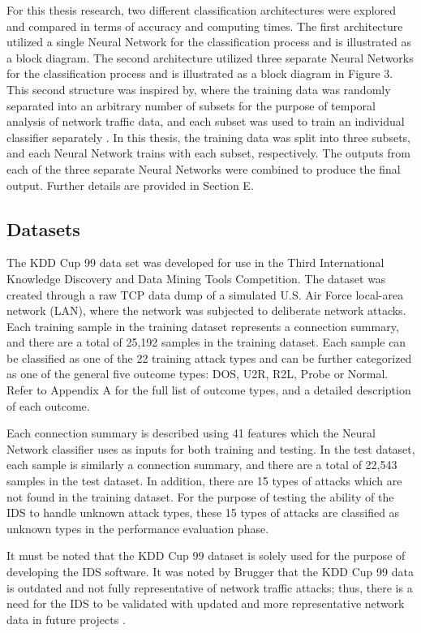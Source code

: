 \documentclass[12pt]{article}
\theoremstyle{definition}
\begin{document}
		For this thesis research, two different classification architectures were explored and compared in terms of accuracy and computing times. The first architecture utilized a single Neural Network for the classification process and is illustrated as a block diagram. The second architecture utilized three separate Neural Networks for the classification process and is illustrated as a block diagram in Figure 3. This second structure was inspired by, where the training data was randomly separated into an arbitrary number of subsets for the purpose of temporal analysis of network traffic data, and each subset was used to train an individual classifier separately \cite{Shamshirband2014}. In this thesis, the training data was split into three subsets, and each Neural Network trains with each subset, respectively. The outputs from each of the three separate Neural Networks were combined to produce the final output. Further details are provided in Section E.
		
		\subsection{Datasets}
		
		The KDD Cup 99 data set was developed for use in the Third International Knowledge Discovery and Data Mining Tools Competition. The dataset was created through a raw TCP data dump of a simulated U.S. Air Force local-area network (LAN), where the network was subjected to deliberate network attacks.
		Each training sample in the training dataset represents a connection summary, and there are a total of 25,192 samples in the training dataset. Each sample can be classified as one of the 22 training attack types and can be further categorized as one of the general five outcome types: DOS, U2R, R2L, Probe or Normal. Refer to Appendix A for the full list of outcome types, and a detailed description of each outcome.
		
		Each connection summary is described using 41 features which the Neural Network classifier uses as inputs for both training and testing. In the test dataset, each sample is similarly a connection summary, and there are a total of 22,543 samples in the test dataset. In addition, there are 15 types of attacks which are not found in the training dataset. For the purpose of testing the ability of the IDS to handle unknown attack types, these 15 types of attacks are classified as unknown types in the performance evaluation phase.
				
		It must be noted that the KDD Cup 99 dataset is solely used for the purpose of developing the IDS software. It was noted by Brugger that the KDD Cup 99 data is outdated and not fully representative of network traffic attacks; thus, there is a need for the IDS to be validated with updated and more representative network data in future projects \citealp{Shamshirband2014}.
		
\end{document}
